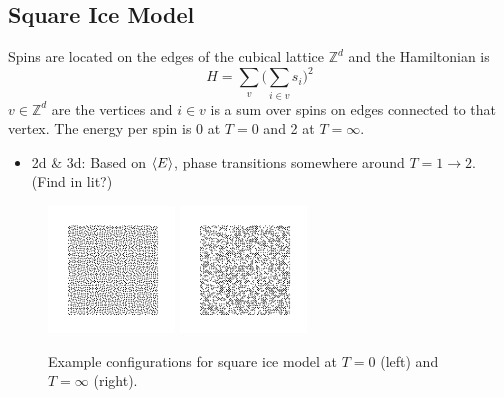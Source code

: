 \documentclass[11pt]{article}
\begin{document}
\subsection{Square Ice Model}
Spins are located on the edges of the cubical lattice $\mathbb{Z}^d$ and the Hamiltonian is
\begin{equation}
    H = \sum_v\Big(\sum_{i\in v}s_i\Big)^2
\end{equation}
$v\in\mathbb{Z}^d$ are the vertices and $i\in v$ is a sum over spins on edges connected to that vertex. The energy per spin is 0 at $T=0$ and 2 at $T=\infty$.
\begin{itemize}
    \item 2d \& 3d: Based on $\ev{E}$, phase transitions somewhere around $T=1\to2$. (Find in lit?)
\end{itemize}
\begin{figure}[h]
    \centering
    \includegraphics[width=0.3\textwidth]{squareice_T=0.png}
    \includegraphics[width=0.3\textwidth]{squareice_T=inf.png}
    \caption{Example configurations for square ice model at $T=0$ (left) and $T=\infty$ (right).}
\end{figure}
\end{document}
